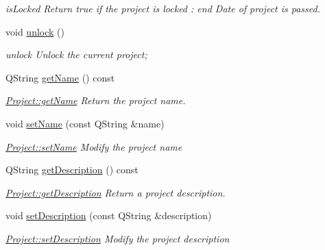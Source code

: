 \begin{DoxyCompactItemize}
\begin{DoxyCompactList}\small\item\em is\-Locked Return true if the project is locked \-: end Date of project is passed. \end{DoxyCompactList}\item 
\hypertarget{classModels_1_1Project_ad7aa6de9c19efe1743cb483e35e5a55c}{void \hyperlink{classModels_1_1Project_ad7aa6de9c19efe1743cb483e35e5a55c}{unlock} ()}\label{classModels_1_1Project_ad7aa6de9c19efe1743cb483e35e5a55c}

\begin{DoxyCompactList}\small\item\em unlock Unlock the current project; \end{DoxyCompactList}\item 
Q\-String \hyperlink{classModels_1_1Project_a11d3b85bdc38daba928bfbfd962a0e32}{get\-Name} () const 
\begin{DoxyCompactList}\small\item\em \hyperlink{classModels_1_1Project_a11d3b85bdc38daba928bfbfd962a0e32}{Project\-::get\-Name} Return the project name. \end{DoxyCompactList}\item 
void \hyperlink{classModels_1_1Project_ac5ffa6ff6d31647fd880881257f47889}{set\-Name} (const Q\-String \&name)
\begin{DoxyCompactList}\small\item\em \hyperlink{classModels_1_1Project_ac5ffa6ff6d31647fd880881257f47889}{Project\-::set\-Name} Modify the project {\itshape name} \end{DoxyCompactList}\item 
Q\-String \hyperlink{classModels_1_1Project_a065b9cd68962c78302a84c686e10ae13}{get\-Description} () const 
\begin{DoxyCompactList}\small\item\em \hyperlink{classModels_1_1Project_a065b9cd68962c78302a84c686e10ae13}{Project\-::get\-Description} Return a project description. \end{DoxyCompactList}\item 
void \hyperlink{classModels_1_1Project_a2cccaca77bff95f13b3320f3f03dc9e7}{set\-Description} (const Q\-String \&description)
\begin{DoxyCompactList}\small\item\em \hyperlink{classModels_1_1Project_a2cccaca77bff95f13b3320f3f03dc9e7}{Project\-::set\-Description} Modify the project {\itshape description} \end{DoxyCompactList}\item 

\end{DoxyCompactItemize}

